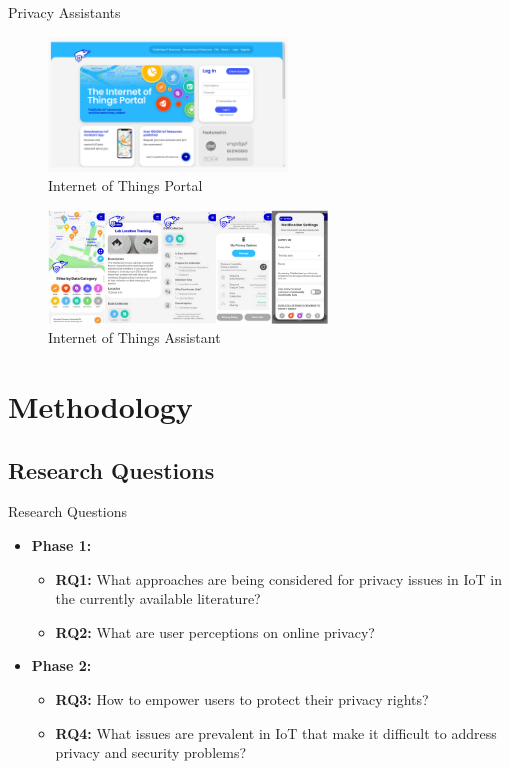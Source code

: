 \documentclass[xcolor={svgnames},aspectratio=169]{beamer}
\begin{document}
\begin{frame}{Privacy Assistants}
    \begin{multicols}{2}
        \begin{figure}
            \centering\includegraphics[width=180pt]{assets/images/iot_portal.png}
            \caption{Internet of Things Portal \cite{DasPersonalized}}
        \end{figure}

        \columnbreak
        \begin{figure}
            \centering\includegraphics[width=210pt]{assets/images/iot_assistant.png}
            \caption{Internet of Things Assistant \cite{FengDesign}}
        \end{figure}
    \end{multicols}
\end{frame}

\section{Methodology}

\subsection{Research Questions}

\begin{frame}{Research Questions}
    \begin{itemize}
        \item<1-> \textbf{Phase 1:}
        \begin{itemize}
            \item<2-> \textbf{RQ1:} What approaches are being considered for privacy issues in IoT in the currently available literature?
            \item<2-> \textbf{RQ2:} What are user perceptions on online privacy?
        \end{itemize}
        \item<1-> \textbf{Phase 2:}
        \begin{itemize}
            \item<3-> \textbf{RQ3:} How to empower users to protect their privacy rights?
            \item<3-> \textbf{RQ4:} What issues are prevalent in IoT that make it difficult to address privacy and security problems?
        \end{itemize}
    \end{itemize}
\end{frame}
\end{document}
